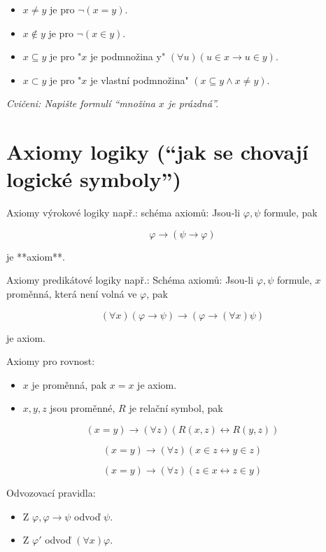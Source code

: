 \begin{itemize}
	\item $x \neq y$ je pro $\neg (x = y)$.
	\item $x \notin y$ je pro $\neg (x \in y)$.
	\item $x \subseteq y$ je pro "$x$ je podmnožina y" $(\forall u)(u \in x \rightarrow u \in y)$.
	\item $x \subset y$ je pro "$x$ je vlastní podmnožina" $(x \subseteq y \land x \neq y)$.
\end{itemize}

\textit{Cvičeni: Napište formulí “množina $x$ je prázdná”.}

\section{Axiomy logiky (“jak se chovají logické symboly”)}

Axiomy výrokové logiky např.: schéma axiomů: Jsou-li $\varphi , \psi$ formule, pak

$$
\varphi \rightarrow (\psi \rightarrow \varphi)
$$

je **axiom**.

Axiomy predikátové logiky např.: Schéma axiomů: Jsou-li $\varphi, \psi$ formule, $x$ proměnná, která není volná ve $\varphi$, pak

$$
(\forall x) (\varphi \rightarrow \psi) \rightarrow (\varphi \rightarrow (\forall x)\psi)
$$

je axiom.

Axiomy pro rovnost:

\begin{itemize}
	\item $x$ je proměnná, pak $x=x$ je axiom.
	\item $x,y,z$ jsou proměnné, $R$ je relační symbol, pak
\end{itemize}

$$
(x=y) \rightarrow (\forall z)(R(x,z) \leftrightarrow R(y,z))
$$

$$
(x=y) \rightarrow (\forall z)(x \in z \leftrightarrow y \in z)
$$

$$
(x=y) \rightarrow (\forall z)(z \in x \leftrightarrow z \in y)
$$

Odvozovací pravidla:

\begin{itemize}
	\item Z $\varphi, \varphi \rightarrow \psi$ odvoď $\psi$.
	\item Z $\varphi'$ odvoď $(\forall x)\varphi$.
\end{itemize}
